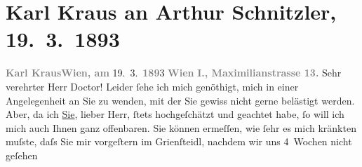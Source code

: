 

         
         \renewcommand{\erwaehntePersonen}{Personen: Richard Beer-Hofmann, Felix Dörmann, Alexander Engel, Otto Erich Hartleben, Karl Kraus, Alexander Landesberg, Detlev von Liliencron, Anton Lindner, Gilbert Otto Neumann-Hofer, Paul Schettler, Josef Schmid-Braunfels, Richard Specht, Leopold Weiß}
         \renewcommand{\erwaehnteInstitutionen}{Institutionen: Magazin für die Literatur des Auslandes, Neue litterarische Blätter, Wiener Tagblatt}
         \renewcommand{\erwaehnteOrte}{Orte: Berlin, Bremen, Café Griensteidl, Mahlerstraße, Wien}
         \renewcommand{\erwaehnteWerke}{Werke: Anatol, Arthur Schnitzler: Anatol, Gedichte, Magazin für die Literatur des Auslandes, Neue litterarische Blätter, Sensationen, Wiener Lyriker}
               \section[Karl Kraus an Arthur Schnitzler, 19. 3. 1893]{ Karl Kraus an Arthur Schnitzler, 19. 3. 1893}\nopagebreak{}\rehead{ }\begin{ledgroupsized}[t]{13cm}\normalsize\beginnumbering \toendnotes[C]{\smallbreak\pagebreak[2]} 
\toendnotes[C]{\smallbreak}\pstart
           \noindent{}{\pb}\textcolor{gray}{\textbf{Karl Kraus}}\hfill \textcolor{gray}{\textbf{Wien, am}}{ }19. 3. \textcolor{gray}{\textbf{189}}3\pend
           \pstart
           \textcolor{gray}{\textbf{Wien}}\pend
           \pstart
           \textcolor{gray}{\textbf{I., Maximilianstrasse 13.}}\pend
           \pstart{}Sehr verehrter Herr Doctor!\pend\pstart
           Leider ſehe ich mich genöthigt, mich in einer Angelegenheit an Sie zu wenden, mit der
               Sie gewiss nicht gerne belästigt werden. Aber, da ich \uline{Sie}, lieber Herr, ſtets hochgeſchätzt und geachtet habe, ſo will ich \introOben{}mich\introOben{} auch Ihnen  ganz offenbaren.
               Sie können ermeſſen, wie ſehr es mich kränkten muſste, daſs Sie mir vorgeſtern im Grienſteidl, nachdem wir uns 4 Wochen nicht geſehen

\end{ledgroupsized}
